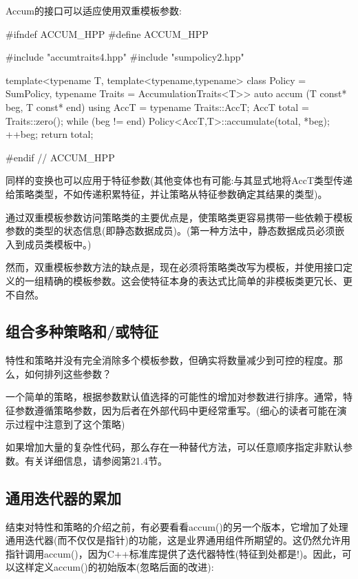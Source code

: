 Accum的接口可以适应使用双重模板参数:

\begin{cpp}
#ifndef ACCUM_HPP
#define ACCUM_HPP

#include "accumtraits4.hpp"
#include "sumpolicy2.hpp"

template<typename T,
		template<typename,typename> class Policy = SumPolicy,
		typename Traits = AccumulationTraits<T>>
auto accum (T const* beg, T const* end)
{
	using AccT = typename Traits::AccT;
	AccT total = Traits::zero();
	while (beg != end) {
		Policy<AccT,T>::accumulate(total, *beg);
		++beg;
	}
	return total;
}

#endif // ACCUM_HPP
\end{cpp}

同样的变换也可以应用于特征参数(其他变体也有可能:与其显式地将AccT类型传递给策略类型，不如传递积累特征，并让策略从特征参数确定其结果的类型)。

通过双重模板参数访问策略类的主要优点是，使策略类更容易携带一些依赖于模板参数的类型的状态信息(即静态数据成员)。(第一种方法中，静态数据成员必须嵌入到成员类模板中。)

然而，双重模板参数方法的缺点是，现在必须将策略类改写为模板，并使用接口定义的一组精确的模板参数。这会使特征本身的表达式比简单的非模板类更冗长、更不自然。

\subsection{组合多种策略和/或特征}

特性和策略并没有完全消除多个模板参数，但确实将数量减少到可控的程度。那么，如何排列这些参数？

一个简单的策略，根据参数默认值选择的可能性的增加对参数进行排序。通常，特征参数遵循策略参数，因为后者在外部代码中更经常重写。(细心的读者可能在演示过程中注意到了这个策略)

如果增加大量的复杂性代码，那么存在一种替代方法，可以任意顺序指定非默认参数。有关详细信息，请参阅第21.4节。

\subsection{通用迭代器的累加}

结束对特性和策略的介绍之前，有必要看看accum()的另一个版本，它增加了处理通用迭代器(而不仅仅是指针)的功能，这是业界通用组件所期望的。这仍然允许用指针调用accum()，因为C++标准库提供了迭代器特性(特征到处都是!)。因此，可以这样定义accum()的初始版本(忽略后面的改进):

